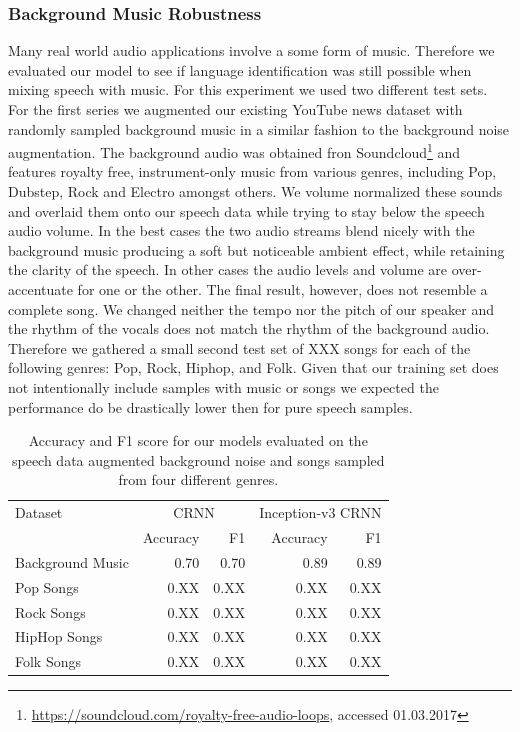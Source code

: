 \subsubsection{Background Music Robustness} 
\label{sec:music_robustness}
Many real world audio applications involve a some form of music. Therefore we evaluated our model to see if language identification was still possible when mixing speech with music. For this experiment we used two different test sets. For the first series we augmented our existing YouTube news dataset with randomly sampled background music in a similar fashion to the background noise augmentation. The background audio was obtained fron Soundcloud\footnote{\url{https://soundcloud.com/royalty-free-audio-loops}, accessed 01.03.2017} and features royalty free, instrument-only music from various genres, including Pop, Dubstep, Rock and Electro amongst others. 
We volume normalized these sounds and overlaid them onto our speech data while trying to stay below the speech audio volume. In the best cases the two audio streams blend nicely with the background music producing a soft but noticeable ambient effect, while retaining the clarity of the speech. In other cases the audio levels and volume are over-accentuate for one or the other. The final result, however, does not resemble a complete song. We changed neither the tempo nor the pitch of our speaker and the rhythm of the vocals does not match the rhythm of the background audio. Therefore we gathered a small second test set of XXX  songs for each of the following genres: Pop, Rock, Hiphop, and Folk. 
Given that our training set does not intentionally include samples with music or songs we expected the performance do be drastically lower then for pure speech samples.

	\begin{table}[]
	\centering
	\begin{tabularx}{\textwidth}{lrrrr}
	\toprule
Dataset & \multicolumn{2}{c}{CRNN} & \multicolumn{2}{c}{Inception-v3 CRNN} \\   
                  & Accuracy  & F1    & Accuracy   & F1   \\ \midrule
Background Music  & 0.70      & 0.70  & 0.89  & 0.89 \\
Pop Songs         & 0.XX      & 0.XX  & 0.XX  & 0.XX \\
Rock Songs        & 0.XX      & 0.XX  & 0.XX  & 0.XX \\
HipHop Songs      & 0.XX      & 0.XX  & 0.XX  & 0.XX \\
Folk Songs        & 0.XX      & 0.XX  & 0.XX  & 0.XX \\

 	\bottomrule
	\end{tabularx}
	\caption{Accuracy and F1 score for our models evaluated on the speech data augmented background noise and songs sampled from four different genres.}
	\label{tab:audio_duration}
	\end{table}

